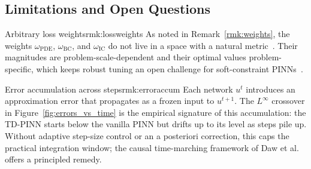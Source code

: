 \subsection{Limitations and Open Questions}

\begin{Rmk}{Arbitrary loss weights}{rmk:lossweights}
  As noted in Remark~\ref{rmk:weights}, the weights $\omega_\text{PDE}$,
  $\omega_\text{BC}$, and $\omega_\text{IC}$ do not live in a space with a
  natural metric~\cite{Wang2021}. Their magnitudes are problem-scale-dependent
  and their optimal values problem-specific, which keeps robust tuning an open
  challenge for soft-constraint PINNs~\cite{Sukumar2022}.
\end{Rmk}

\begin{Rmk}{Error accumulation across steps}{rmk:erroraccum}
  Each network $u^t$ introduces an approximation error that propagates as a
  frozen input to $u^{t+1}$. The $L^\infty$ crossover in
  Figure~\ref{fig:errors_vs_time} is the empirical signature of this
  accumulation: the TD-PINN starts below the vanilla PINN but drifts up to its
  level as steps pile up. Without adaptive step-size control or an a posteriori
  correction, this caps the practical integration window; the causal
  time-marching framework of Daw et al.~\cite{Daw2023} offers a principled
  remedy.
\end{Rmk}
